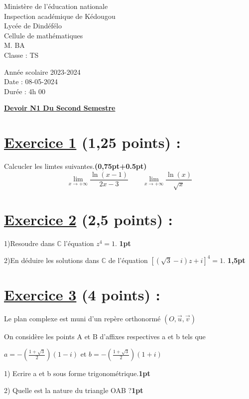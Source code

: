 \documentclass[12pt]{article}
\begin{document}
\begin{minipage}{0.5\textwidth}
	Ministère de l'éducation nationale  \\
	Inspection académique de Kédougou   \\
	Lycée de Dindéfélo            \\
	Cellule de mathématiques            \\
	M. BA                          \\
	Classe : TS  \\
\end{minipage}
\begin{minipage}{0.5\textwidth}
	Année scolaire 2023-2024 \\
	Date : 08-05-2024 \\
	Durée : 4h 00 \\
\end{minipage}

\begin{center}
	\textbf{{\underline{Devoir N1 Du Second Semestre}}}
\end{center}
\section*{\underline{Exercice 1} (1,25 points) :}
Calcucler les limtes suivantes.\textbf{(0,75pt+0.5pt)}
\[\lim_{x \to +\infty}\frac{\ln(x-1)}{2x-3}\quad\quad\lim_{x \to +\infty}\frac{\ln(x)}{\sqrt{x}}\]
\section*{\underline{Exercice 2} (2,5 points) :}
1)Resoudre dans $\mathbb{C}$ l'équation $z^{4}=1$. \textbf{1pt}

2)En déduire les solutions dans $\mathbb{C}$ de l'équation $\left[\left(\sqrt{3}-i\right)z+i  \right]^{4}=1$. \textbf{1,5pt}
\section*{\underline{Exercice 3} (4 points) :}
Le plan complexe est muni d’un repère orthonormé $(O,\vec{u},\vec{v})$

On considère les points A et B d’affixes respectives a et b tels que

$a=-(\frac{1+\sqrt{3}}{2})(1-i)$ et $b=-(\frac{1+\sqrt{3}}{2})(1+i)$ 

1) Ecrire a et b sous forme trigonométrique.\textbf{1pt}

2) Quelle est la nature du triangle OAB ?\textbf{1pt}
\end{document}
